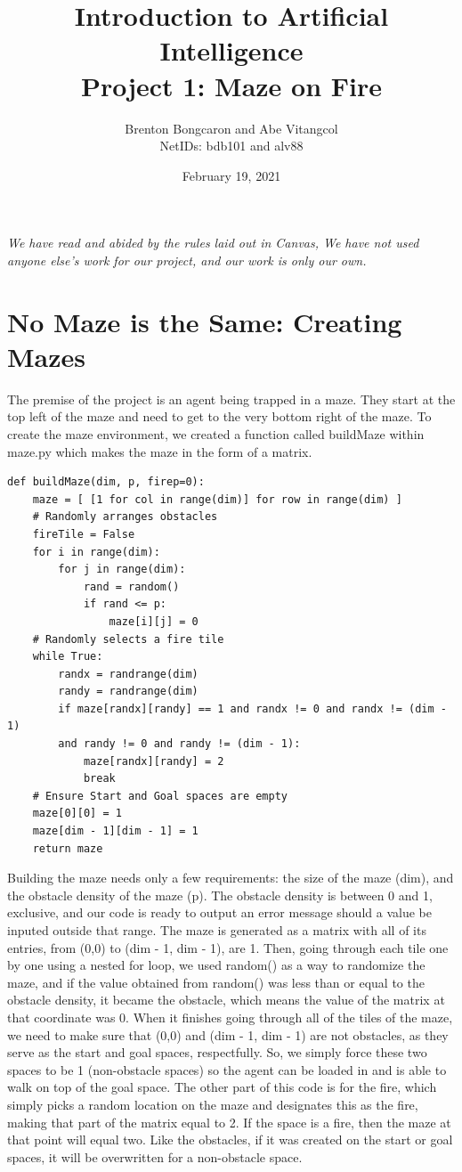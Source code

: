 \documentclass[11pt]{article}
\title{\textbf{Introduction to Artificial Intelligence\\
		\large Project 1: Maze on Fire}}
\author{Brenton Bongcaron and Abe Vitangcol\\NetIDs: bdb101 and alv88}
\date{February 19, 2021}
\begin{document}
	\maketitle
\textit{We have read and abided by the rules laid out in Canvas, We have not used anyone else's work for our project, and our work is only our own.}
\tableofcontents
\listoffigures
\pagebreak
\section{No Maze is the Same: Creating Mazes}
The premise of the project is an agent being trapped in a maze. They start at the top left of the maze and need to get to the very bottom right of the maze. To create the maze environment, we created a function called buildMaze within maze.py which makes the maze in the form of a matrix.
\begin{verbatim}
def buildMaze(dim, p, firep=0):
    maze = [ [1 for col in range(dim)] for row in range(dim) ]
    # Randomly arranges obstacles
    fireTile = False
    for i in range(dim):
        for j in range(dim):
            rand = random()
            if rand <= p:
                maze[i][j] = 0
    # Randomly selects a fire tile
    while True:
        randx = randrange(dim)
        randy = randrange(dim)
        if maze[randx][randy] == 1 and randx != 0 and randx != (dim - 1)
        and randy != 0 and randy != (dim - 1):
            maze[randx][randy] = 2
            break
    # Ensure Start and Goal spaces are empty
    maze[0][0] = 1
    maze[dim - 1][dim - 1] = 1
    return maze

\end{verbatim}
Building the maze needs only a few requirements: the size of the maze (dim), and the obstacle density of the maze (p). The obstacle density is between 0 and 1, exclusive, and our code is ready to output an error message should a value be inputed outside that range. The maze is generated as a matrix with all of its entries, from (0,0) to (dim - 1, dim - 1), are 1. Then, going through each tile one by one using a nested for loop, we used random() as a way to randomize the maze, and if the value obtained from random() was less than or equal to the obstacle density, it became the obstacle, which means the value of the matrix at that coordinate was 0. When it finishes going through all of the tiles of the maze, we need to make sure that (0,0) and (dim - 1, dim - 1) are not obstacles, as they serve as the start and goal spaces, respectfully. So, we simply force these two spaces to be 1 (non-obstacle spaces) so the agent can be loaded in and is able to walk on top of the goal space.
The other part of this code is for the fire, which simply picks a random location on the maze and designates this as the fire, making that part of the matrix equal to 2. If the space is a fire, then the maze at that point will equal two. Like the obstacles, if it was created on the start or goal spaces, it will be overwritten for a non-obstacle space.
	\pagebreak
\end{document}
